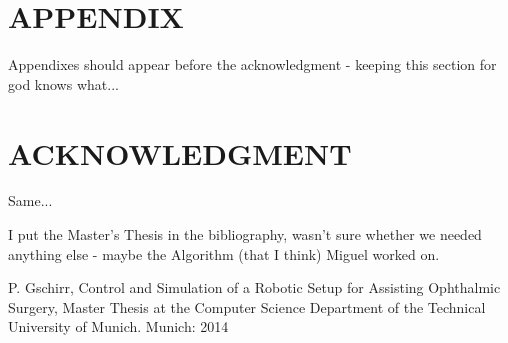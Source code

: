 \documentclass[a4paper, 10pt, conference]{ieeeconf}      %
\begin{document}
\addtolength{\textheight}{-12cm} 

\section*{APPENDIX}

Appendixes should appear before the acknowledgment - keeping this section for god knows what...

\section*{ACKNOWLEDGMENT}

Same...

I put the Master\rq s Thesis in the bibliography, wasn\rq t sure whether we needed anything else - maybe the Algorithm (that I  think) Miguel worked on.
\begin{thebibliography}{99}
 P. Gschirr, Control and Simulation of a Robotic Setup for Assisting Ophthalmic Surgery, Master Thesis at the Computer Science Department of the Technical University of Munich. Munich: 2014
\end{thebibliography}
\end{document}
